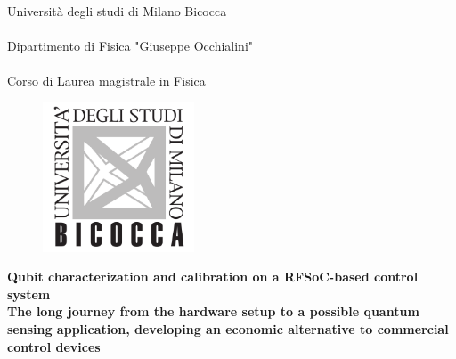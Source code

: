 

\begin{titlepage}

\begin{center}
    {\LARGE{Università degli studi di Milano Bicocca}}\\
    {\hspace{1cm}}\\
    {\small{Dipartimento di Fisica "Giuseppe Occhialini"}}\\
    {\hspace{1cm}}\\
    {\small{Corso di Laurea magistrale in Fisica}}
\end{center}

\vspace{0.2cm}

\begin{figure}[H]
    \centering
    \includegraphics[width=0.4\textwidth]{stuff/logo.png}
\end{figure}

\vspace{0.5cm}


\begin{center}
    {\textbf{\LARGE {Qubit characterization and calibration on a RFSoC-based control system}}} \\ \vspace{0.4cm}
    {\textbf{\large {The long journey from the hardware setup to a possible quantum sensing application, developing an economic alternative to commercial control devices}}}
\end{center}

\vspace{1.8cm}


\end{titlepage}
